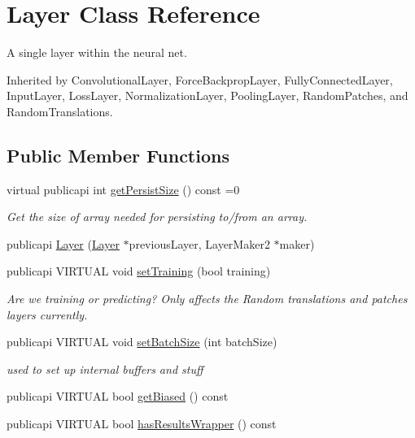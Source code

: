 \hypertarget{classLayer}{\section{Layer Class Reference}
\label{classLayer}
}


A single layer within the neural net.  




Inherited by Convolutional\-Layer, Force\-Backprop\-Layer, Fully\-Connected\-Layer, Input\-Layer, Loss\-Layer, Normalization\-Layer, Pooling\-Layer, Random\-Patches, and Random\-Translations.

\subsection*{Public Member Functions}
\begin{DoxyCompactItemize}
\item 
virtual publicapi int \hyperlink{classLayer_a8ad13f9abd9accb3577cec64172c3cfa}{get\-Persist\-Size} () const =0
\begin{DoxyCompactList}\small\item\em Get the size of array needed for persisting to/from an array. \end{DoxyCompactList}\item 
publicapi \hyperlink{classLayer_af8926e30054e50a5c7d1b29a8be05164}{Layer} (\hyperlink{classLayer}{Layer} $\ast$previous\-Layer, Layer\-Maker2 $\ast$maker)
\item 
publicapi V\-I\-R\-T\-U\-A\-L void \hyperlink{classLayer_ae4347df6631ca9af22de31d3d1c1273d}{set\-Training} (bool training)
\begin{DoxyCompactList}\small\item\em Are we training or predicting? Only affects the Random translations and patches layers currently. \end{DoxyCompactList}\item 
publicapi V\-I\-R\-T\-U\-A\-L void \hyperlink{classLayer_a9779cba6c042648fcce1c605e4bed3b8}{set\-Batch\-Size} (int batch\-Size)
\begin{DoxyCompactList}\small\item\em used to set up internal buffers and stuff \end{DoxyCompactList}\item 
publicapi V\-I\-R\-T\-U\-A\-L bool \hyperlink{classLayer_ab79827404ddcc0748363ee82f80f5500}{get\-Biased} () const 
\item 
publicapi V\-I\-R\-T\-U\-A\-L bool \hyperlink{classLayer_a6266a51eb760e512987aa8370d5c8c55}{has\-Results\-Wrapper} () const 

\end{DoxyCompactItemize}
